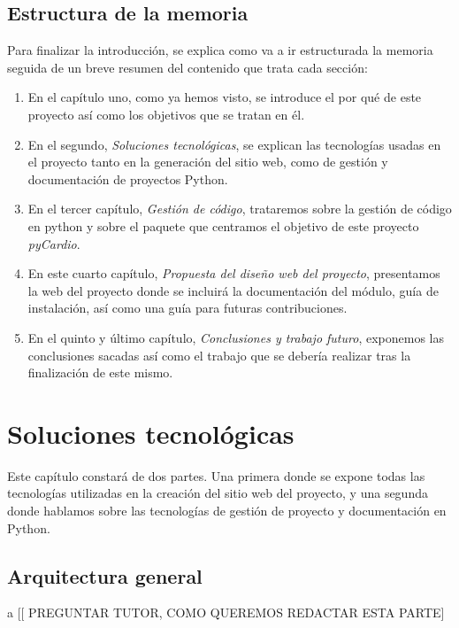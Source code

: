 \documentclass[a4paper, 12pt]{book}
\begin{document}
\section{Estructura de la memoria}
\label{sec:estruc}
Para finalizar la introducción, se explica como va a ir estructurada la memoria seguida de un breve resumen del contenido que trata cada sección: 
\begin{enumerate}
    \item En el capítulo uno, como ya hemos visto, se introduce el por qué de este proyecto así como los objetivos que se tratan en él.
    \item En el segundo, \emph{Soluciones tecnológicas}, se explican las tecnologías usadas en el proyecto tanto en la generación del sitio web, como de gestión y documentación de proyectos Python.
    \item En el tercer capítulo, \emph{Gestión de código}, trataremos sobre la gestión de código en python y sobre el paquete que centramos el objetivo de este proyecto \emph{pyCardio}.
    \item En este cuarto capítulo, \emph{Propuesta del diseño web del proyecto}, presentamos la web del proyecto donde se incluirá la documentación del módulo, guía de instalación, así como una guía para futuras contribuciones.
    \item En el quinto y último capítulo, \emph{Conclusiones y trabajo futuro}, exponemos las conclusiones sacadas así como el trabajo que se debería realizar tras la finalización de este mismo.
\end{enumerate}

\chapter{Soluciones tecnológicas}
\label{chap:Arqui}
Este capítulo constará de dos partes. Una primera donde se expone todas las tecnologías utilizadas en la creación del sitio web del proyecto, y una segunda donde hablamos sobre las tecnologías de gestión de proyecto y documentación en Python.


\section{Arquitectura general}a
\label{sec:arqui}
[[  PREGUNTAR TUTOR, COMO QUEREMOS REDACTAR ESTA PARTE]
\end{document}
